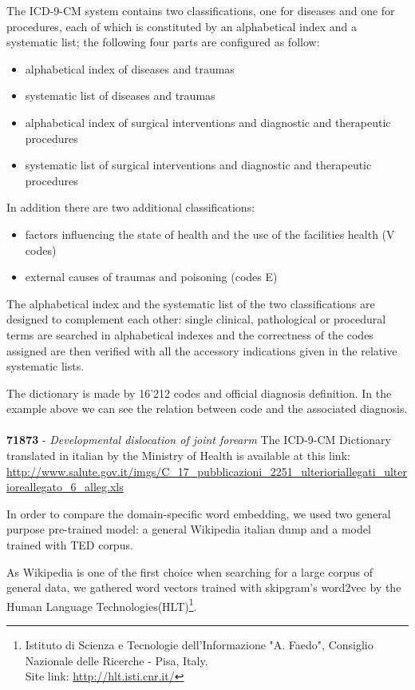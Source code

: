 The ICD-9-CM system contains two classifications, one for diseases and one for procedures, each of which is constituted by an alphabetical index and a systematic list; the following four parts are configured as follow:
\begin{itemize}
	\item alphabetical index of diseases and traumas
	\item systematic list of diseases and traumas
	\item alphabetical index of surgical interventions and diagnostic and therapeutic procedures
	\item systematic list of surgical interventions and diagnostic and therapeutic procedures
\end{itemize}
In addition there are two additional classifications:
\begin{itemize}
	\item factors influencing the state of health and the use of the facilities health (V codes)
	\item external causes of traumas and poisoning (codes E)
\end{itemize}
The alphabetical index and the systematic list of the two classifications are designed to complement each other: single clinical, pathological or procedural terms are searched in alphabetical indexes and the correctness of the codes assigned are then verified with all the accessory indications given in the relative systematic lists.


The dictionary is made by 16'212 codes and official diagnosis definition. In the example above %
we can see the relation between code and the associated diagnosis.
\\\\
\indent \textbf{71873} - \textit{Developmental dislocation of joint forearm}
The ICD-9-CM Dictionary translated in italian by the Ministry of Health is available at this link: \url{http://www.salute.gov.it/imgs/C\_17\_pubblicazioni\_2251\_ulterioriallegati\_ulterioreallegato\_6\_alleg.xls}


In order to compare the domain-specific word embedding, we used two general purpose pre-trained model: a general Wikipedia italian dump and a model trained with TED corpus.

As Wikipedia is one of the first choice when searching for a large corpus of general data, we gathered word vectors trained with skipgram's word2vec by the
Human Language Technologies(HLT)\footnote{Istituto di Scienza e Tecnologie dell'Informazione "A. Faedo", Consiglio Nazionale delle Ricerche - Pisa, Italy.\\Site link:  \url{http://hlt.isti.cnr.it/}}.

